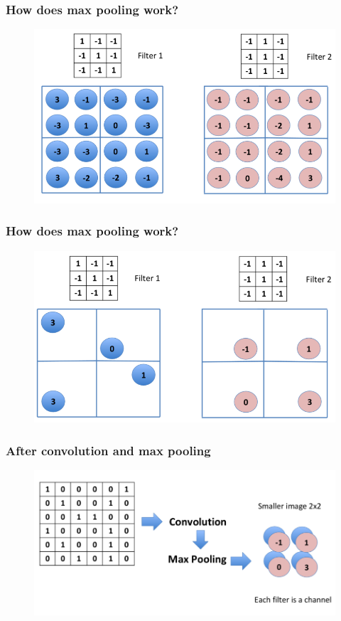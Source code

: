 \documentclass{beamer}
\begin{document}
\begin{frame}
	\frametitle{How does max pooling work?}
	\begin{figure}
		\includegraphics[width=0.9\linewidth]{cnn_procedure_6}
	\end{figure}
\end{frame}

\begin{frame}
	\frametitle{How does max pooling work?}
	\begin{figure}
		\includegraphics[width=0.95\linewidth]{cnn_procedure_7}
	\end{figure}
\end{frame}

\begin{frame}
	\frametitle{After convolution and max pooling}
	\begin{figure}
		\includegraphics[width=\linewidth]{cnn_procedure_8}
	\end{figure}
\end{frame}
\end{document}
